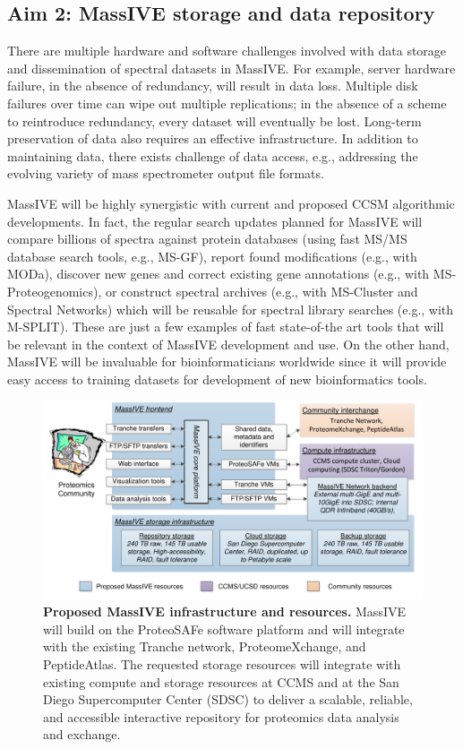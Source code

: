 \documentclass[arial,11pt]{article}
\begin{document}
\subsection{Aim 2: MassIVE storage and data repository}

There are multiple hardware and software challenges involved with data storage and dissemination of spectral datasets in MassIVE. For example, server hardware failure, in the absence of redundancy, will  result in data loss. Multiple disk failures over time can wipe out multiple replications; in the absence of a scheme to reintroduce redundancy, every dataset will eventually be lost. Long-term preservation of data also requires an effective infrastructure. In addition to maintaining data, there exists challenge of data access, e.g., addressing the evolving variety of mass spectrometer output file formats.

MassIVE will be highly synergistic with current and proposed CCSM algorithmic developments.  In fact, the regular search updates planned for MassIVE will compare billions of spectra against protein databases (using fast MS/MS database search tools, e.g., MS-GF), report found modifications (e.g., with MODa), discover new genes and correct existing gene annotations (e.g., with MS-Proteogenomics), or construct spectral archives (e.g., with MS-Cluster and Spectral Networks) which will be reusable for spectral library searches (e.g., with M-SPLIT). These are just a few examples of fast state-of-the art tools that will be relevant in the context of MassIVE development and use. On the other hand, MassIVE will be invaluable for bioinformaticians worldwide since it will provide easy access to training datasets for development of new  bioinformatics tools.

\begin{figure}[ht]
  \centering
  \includegraphics[width=\textwidth]{figures/Architecture.pdf}
  \caption{\footnotesize {\bf Proposed MassIVE infrastructure and resources.} MassIVE will build on the ProteoSAFe software platform and will integrate with the existing Tranche network, ProteomeXchange, and PeptideAtlas. The requested storage resources will integrate with existing compute and storage resources at CCMS and at the San Diego Supercomputer Center (SDSC) to deliver a scalable, reliable, and accessible interactive repository for proteomics data analysis and exchange.}
  \label{trd.software.fig.massiveArch}
\end{figure}
\end{document}
